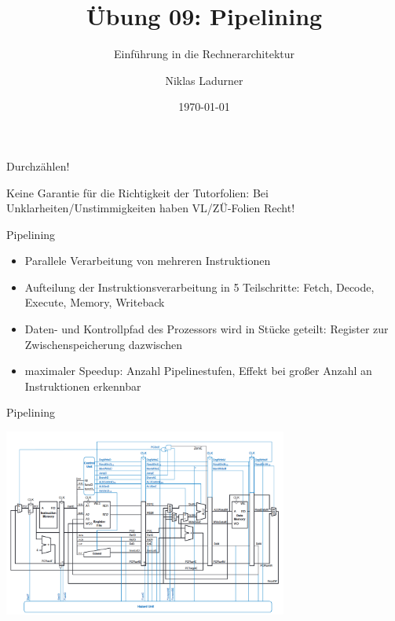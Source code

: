 \documentclass[
  german,            %
  aspectratio=169,    %
]{tumbeamer}
\title{Übung 09: Pipelining}
\subtitle{Einführung in die Rechnerarchitektur}
\author{Niklas Ladurner}
\institute{\theChairName\\\theDepartmentName\\\theUniversityName}
\date[\today]{\today}
\begin{document}
\maketitle

\begin{frame}[c]{}{}
  \begin{center}
    \LARGE  Durchzählen!
  \end{center}
\end{frame}

\begin{frame}[c]{}{}
  \begin{center}
    \LARGE  Keine Garantie für die Richtigkeit der Tutorfolien: Bei Unklarheiten/Unstimmigkeiten
    haben VL/ZÜ-Folien Recht!
  \end{center}
\end{frame}

\begin{frame}[fragile, c]{Pipelining}{}
  \begin{itemize}
    \item Parallele Verarbeitung von mehreren Instruktionen
    \item Aufteilung der Instruktionsverarbeitung in 5 Teilschritte: Fetch, Decode, Execute, Memory, Writeback
    \item Daten- und Kontrollpfad des Prozessors wird in Stücke geteilt: Register zur Zwischenspeicherung dazwischen
    \item maximaler Speedup: Anzahl Pipelinestufen, Effekt bei großer Anzahl an Instruktionen erkennbar
  \end{itemize}

\end{frame}

\begin{frame}[fragile, c]{Pipelining}{}
  \begin{center}
    \includegraphics[width=0.7\textwidth]{w09_pipelined.png}
  \end{center}
\end{frame}
\end{document}

